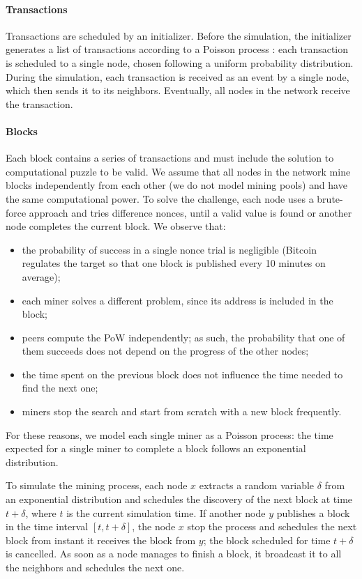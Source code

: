\paragraph{Transactions}
Transactions are scheduled by an initializer.
Before the simulation, the initializer generates a list of transactions according to a Poisson process \cite{wikipedia_poisson_process}:
each transaction is scheduled to a single node, chosen following a uniform probability distribution.
During the simulation, each transaction is received as an event by a single node, which then sends it to its neighbors.
Eventually, all nodes in the network receive the transaction.

\paragraph{Blocks}
Each block contains a series of transactions and must include the solution to computational puzzle to be valid.
We assume that all nodes in the network mine blocks independently from each other (we do not model mining pools) and have the same computational power.
To solve the challenge, each node uses a brute-force approach and tries difference nonces, until a valid value is found or another node completes the current block.
We observe that:
\begin{itemize}
	\item the probability of success in a single nonce trial is negligible (Bitcoin regulates the target so that one block is published every \num{10} minutes on average);
	\item each miner solves a different problem, since its address is included in the block;
	\item peers compute the \ac{PoW} independently; as such, the probability that one of them succeeds does not depend on the progress of the other nodes;
	\item the time spent on the previous block does not influence the time needed to find the next one;
	\item miners stop the search and start from scratch with a new block frequently.
\end{itemize}
For these reasons, we model each single miner as a Poisson process:
the time expected for a single miner to complete a block follows an exponential distribution.

\medskip
To simulate the mining process, each node $x$ extracts a random variable $\delta$ from an exponential distribution and schedules the discovery of the next block at time $t + \delta$, where $t$ is the current simulation time.
If another node $y$ publishes a block in the time interval $[t, t + \delta]$, the node $x$ stop the process and schedules the next block from instant it receives the block from $y$;
the block scheduled for time $t + \delta$ is cancelled.
As soon as a node manages to finish a block, it broadcast it to all the neighbors and schedules the next one.

